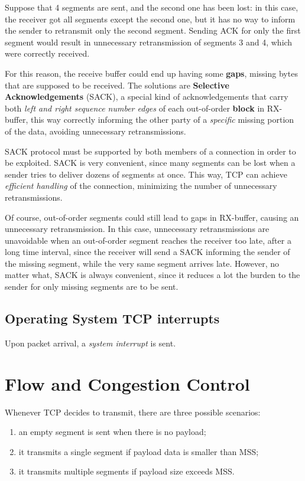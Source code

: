 \documentclass[10pt]{book}
\begin{document}
Suppose that 4 segments are sent, and the second one has been lost: in this
case, the receiver got all segments except the second one, but it has
no way to inform the sender to retransmit only the second segment. Sending
ACK for only the first segment would result in unnecessary retransmission of
segments 3 and 4, which were correctly received. 

For this reason, the receive buffer could end up having some \textbf{gaps}, missing bytes that
are supposed to be received. The solutions are \textbf{Selective
Acknowledgements} (SACK), a special kind of acknowledgements that carry both
\emph{left and right sequence number edges} of each out-of-order \textbf{block}
in RX-buffer, this way correctly informing the other party of a \emph{specific}
missing portion of the data, avoiding unnecessary retransmissions. 

SACK protocol must be supported by both members of a connection in order to be
exploited. SACK is very convenient, since many segments can be lost when a
sender tries to deliver dozens of segments at once. This way, TCP can achieve
\emph{efficient handling} of the connection, minimizing the number of
unnecessary retransmissions.

Of course, out-of-order segments could still lead to gaps in RX-buffer, causing
an unnecessary retransmission. In this case, unnecessary retransmissions are
unavoidable when an out-of-order segment reaches the receiver too late, after a
long time interval, since the receiver will send a SACK informing the sender of
the missing segment, while the very same segment arrives late. However, no
matter what, SACK is always convenient, since it reduces a lot the burden to
the sender for only missing segments are to be sent.

\section{Operating System TCP interrupts}

Upon packet arrival, a \emph{system interrupt} is sent. 

\chapter{Flow and Congestion Control}

Whenever TCP decides to transmit, there are three possible scenarios: 
\begin{enumerate}
	\item an empty segment is sent when there is no payload;
	\item it transmits a single segment if payload data is smaller than MSS;
	\item it transmits multiple segments if payload size exceeds MSS.
\end{enumerate}
\end{document}
